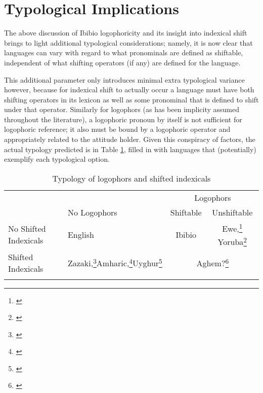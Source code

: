 \documentclass[output=paper]{langscibook}
\begin{document}
\section{Typological Implications}

The above discussion of Ibibio logophoricity and its insight into indexical shift brings to light additional typological considerations; namely, it is now clear that languages can vary with regard to what pronominals are defined as shiftable, independent of what shifting operators (if any) are defined for the language.

This additional parameter only introduces minimal extra typological variance however, because for indexical shift to actually occur a language must have both shifting operators in its lexicon as well as some pronominal that is defined to shift under that operator. Similarly for logophors (as has been implicity assumed throughout the literature), a logophoric pronoun by itself is not sufficient for logophoric reference; it also must be bound by a logophoric operator and appropriately related to the attitude holder. Given this conspiracy of factors, the actual typology predicted is in Table \ref{type}, filled in with languages that (potentially) exemplify each typological option.



\begin{table}
\begin{tabularx}{\textwidth}{l>{\centering}Xcc}
          \lsptoprule
	&	&	\multicolumn{2}{c}{{Logophors}} \\\cmidrule(lr){3-4}
	&	{No Logophors}	&	{Shiftable}	&	{Unshiftable} \\ \midrule
{No Shifted Indexicals} &	English	&	Ibibio	&	Ewe,\footnote{\citet{Clements1975,Pearson2015}} Yoruba\footnote{\citet{Adesola2005}} \\
	{Shifted Indexicals}	& Zazaki,\footnote{\citet{Anand2004,Anand2006}}\newline Amharic,\footnote{\citet{Schlenker2003}}\newline Uyghur\footnote{\citet{Sudo2012,Shklovsky2014}}	&	\multicolumn{2}{c}{Aghem?\footnote{\citet{Hyman1979}}} \\
	\lspbottomrule
\end{tabularx}
\caption{Typology of logophors and shifted indexicals}\label{type}
\end{table}
\end{document}
